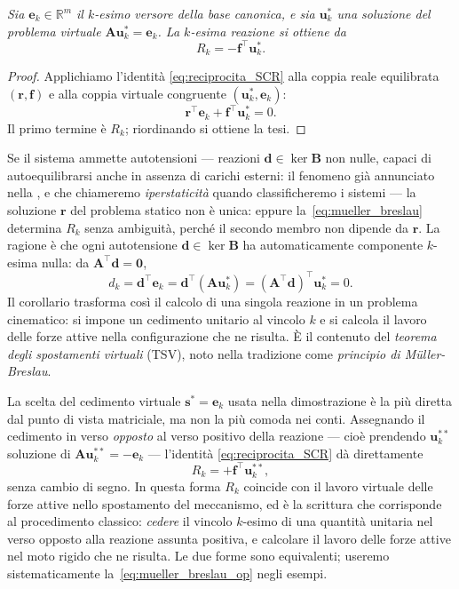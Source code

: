 \medskip

\emph{Sia $\bm e_k\in\mathbb R^m$ il $k$-esimo versore della base
	canonica, e sia $\bm u^*_k$ una soluzione del
	\emph{problema virtuale} $\bm A\bm u^*_k=\bm e_k$. La
	$k$-esima reazione si ottiene da
	\begin{equation}\label{eq:mueller_breslau}
		R_k = -\bm f^{\top}\bm u^*_k.
	\end{equation}
}

\medskip 

\begin{proof}
	Applichiamo l'identità \eqref{eq:reciprocita_SCR} alla
	coppia reale equilibrata $(\bm r,\bm f)$ e alla coppia
	virtuale congruente $(\bm u^*_k,\bm e_k)$:
	\[
	\bm r^\top\bm e_k+\bm f^\top\bm u^*_k=0.
	\]
	Il primo termine è $R_k$; riordinando si ottiene la tesi.
\end{proof}
\begin{oss}
	Se il sistema ammette autotensioni --- reazioni
	$\bm d\in\ker\bm B$ non nulle, capaci di autoequilibrarsi
	anche in assenza di carichi esterni: il fenomeno già
	annunciato nella , e che chiameremo
	\emph{iperstaticità} quando classificheremo i sistemi ---
	la soluzione $\bm r$ del problema statico non è unica:
	eppure la~\eqref{eq:mueller_breslau} determina $R_k$ senza
	ambiguità, perché il secondo membro non dipende da $\bm r$.
	La ragione è che ogni autotensione $\bm d\in\ker\bm B$ ha
	automaticamente componente $k$-esima nulla: da $\bm
	A^\top\bm d=\bm 0$,
	\[
	d_k=\bm d^\top\bm e_k=\bm d^\top(\bm A\bm u_k^*)
	=(\bm A^\top\bm d)^\top\bm u_k^*=0.
	\]
	Il corollario trasforma così il calcolo di una singola
	reazione in un problema cinematico: si impone un cedimento
	unitario al vincolo $k$ e si calcola il lavoro delle forze
	attive nella configurazione che ne risulta. È il contenuto
	del \emph{teorema degli spostamenti virtuali} (TSV), noto
	nella tradizione come \emph{principio di Müller-Breslau}.
\end{oss}
\begin{oss}
	La scelta del cedimento virtuale $\bm s^*=\bm e_k$ usata
	nella dimostrazione è la più diretta dal punto di vista
	matriciale, ma non la più comoda nei conti. Assegnando il
	cedimento in verso \emph{opposto} al verso positivo della
	reazione --- cioè prendendo $\bm u^{**}_k$ soluzione di
	$\bm A\bm u^{**}_k=-\bm e_k$ --- l'identità
	\eqref{eq:reciprocita_SCR} dà direttamente
	\begin{equation}\label{eq:mueller_breslau_op}
		R_k=+\bm f^\top\bm u^{**}_k,
	\end{equation}
	senza cambio di segno. In questa forma $R_k$ coincide con
	il lavoro virtuale delle forze attive nello spostamento del
	meccanismo, ed è la scrittura che corrisponde al
	procedimento classico: \emph{cedere} il vincolo $k$-esimo
	di una quantità unitaria nel verso opposto alla reazione
	assunta positiva, e calcolare il lavoro delle forze attive
	nel moto rigido che ne risulta. Le due forme sono
	equivalenti; useremo sistematicamente
	la~\eqref{eq:mueller_breslau_op} negli esempi.
\end{oss}

